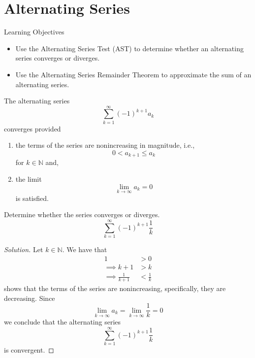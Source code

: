 \documentclass[compacto,10pt,comentarios]{aleph-notas}
\begin{document}
\encabezado
\section*{Alternating Series}
\begin{mdframed}
    \center Learning Objectives \\
    \begin{itemize}
        \item Use the Alternating Series Test (AST) to determine whether an alternating series converges or diverges.
        \item Use the Alternating Series Remainder Theorem to approximate the sum of an alternating series.
    \end{itemize}
\end{mdframed}

\begin{teo}
    The alternating series
    $$
        \sum_{k=1}^{\infty} (-1)^{k+1} a_k
    $$
    converges provided
    \begin{enumerate}
        \item the terms of the series are nonincreasing in magnitude, i.e.,
        $$
            0 < a_{k+1} \leq a_{k}
        $$
        for $k \in \mathbb{N}$ and,
        \item the limit 
        $$
            \lim_{k \to \infty} a_k = 0
        $$
        is satisfied.
    \end{enumerate}
\end{teo}

\begin{ejer}
    Determine whether the series converges or diverges.
    $$
        \sum_{k=1}^{\infty} (-1)^{k+1} \frac{1}{k}
    $$
\end{ejer}
\begin{proof}[Solution]
    Let $k \in \mathbb{N}$. We have that
    \begin{align*}
    1 & > 0 \\
    \implies k + 1 & > k \\
    \implies \frac{1}{k+1} & < \frac{1}{k}
    \end{align*}
    shows that the terms of the series are nonincreasing, specifically, they are decreasing. Since
    $$
        \lim_{k \to \infty} a_k = \lim_{k \to \infty} \frac{1}{k} = 0
    $$
    we conclude that the alternating series
    $$
        \sum_{k=1}^{\infty} (-1)^{k+1} \frac{1}{k}
    $$
    is convergent.
\end{proof}
\end{document}
